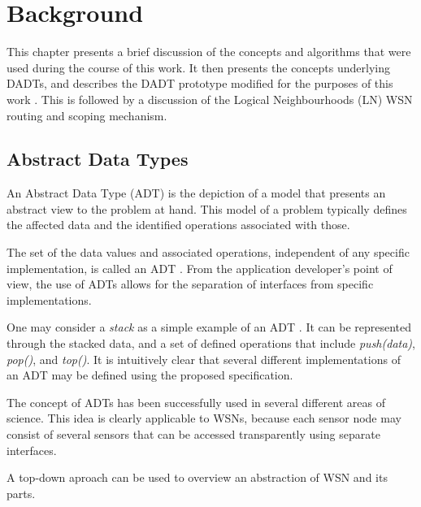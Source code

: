 \chapter{Background} \label{chap:background}

This chapter presents a brief discussion of the concepts and algorithms
that were used during the course of this work. It then presents the concepts underlying DADTs, and describes the DADT
prototype modified for the purposes of this work \cite{migliavacca_DADT:2006}.
This is followed by a discussion of the Logical Neighbourhoods (LN)
\cite{mottola_LNScoping:2006} WSN routing and scoping mechanism.

\section{Abstract Data Types}

An Abstract Data Type (ADT) is the depiction of a model that
presents an abstract view to the problem at hand. This model of a problem
typically defines the affected data and the identified operations associated with
those.

The set of the data values and associated operations, independent of any
specific implementation, is called an ADT \cite{NIST_website}. From the
application developer's point of view, the use of ADTs allows for the separation of
interfaces from specific implementations.

One may consider a \emph{stack} as a simple example of an ADT
\cite{guttag_ADTs:1977}. It can be represented through the stacked data, and a set of defined
operations that include \emph{push(data)}, \emph{pop()}, and \emph{top()}. It is intuitively clear that
several different implementations of an ADT may be defined using the proposed specification.



The concept of ADTs has been successfully used in several different areas of
science. This idea is clearly applicable to WSNs, because each sensor node may
consist of several sensors that can be accessed transparently using separate interfaces.

A top-down aproach can be used to overview an abstraction of WSN and its parts.

